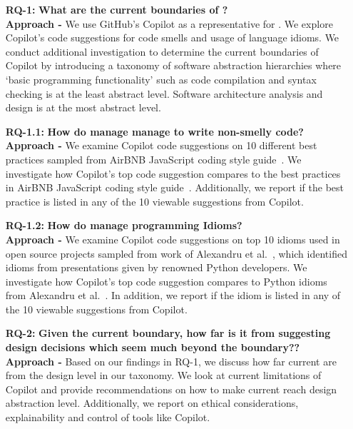 \begin{enumerate}
  \item[\textbf{RQ-1: }]
  \textbf{What are the current boundaries of \cct{}?} \\
  \textbf{Approach -} We use GitHub's Copilot as a representative for \cct{}. We explore Copilot's code suggestions for code smells and usage of language idioms. We conduct additional investigation to determine the current boundaries of Copilot by introducing a taxonomy of software abstraction hierarchies where ‘basic programming functionality’ such as code compilation and syntax checking is at the least abstract level. Software architecture analysis and design is at the most abstract level. 
  
  \item[\textbf{RQ-1.1: }]
  \textbf{How do \cct{} manage manage to write non-smelly code?} \\
\textbf{Approach -} We examine Copilot code suggestions on 10 different best practices sampled from AirBNB JavaScript coding style guide~\cite{airbnb_code}. We investigate how Copilot's top code suggestion compares to the best practices in AirBNB JavaScript coding style guide~\cite{airbnb_code}. Additionally, we report if the best practice is listed in any of the 10 viewable suggestions from Copilot. 
  
  \item[\textbf{RQ-1.2: }]
  \textbf{How do \cct{} manage programming Idioms?} \\
  \textbf{Approach -} We examine Copilot code suggestions on top 10 idioms used in open source projects sampled from work of Alexandru et al.~\cite{Alexandru2018}, which identified idioms from presentations given by renowned Python developers. We investigate how Copilot's top code suggestion compares to Python idioms from Alexandru et al.~\cite{Alexandru2018}. In addition, we report if the idiom is listed in any of the 10 viewable suggestions from Copilot.
  
  \item[\textbf{RQ-2: }]
  \textbf{Given the current boundary, how far is it from suggesting design decisions which seem much beyond the boundary??} \\
  \textbf{Approach -} Based on our findings in RQ-1, we discuss how far current \cct{} are from the design level in our taxonomy. We look at current limitations of Copilot and provide recommendations on how to make current \cct{} reach design abstraction level. Additionally, we report on ethical considerations, explainability and control of tools like Copilot. 
\end{enumerate}